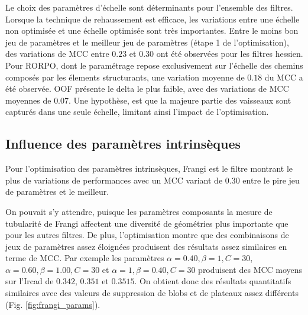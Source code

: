 Le choix des paramètres d'échelle sont déterminants pour l'ensemble des filtres. Lorsque la technique de rehaussement est efficace, les variations entre une échelle non optimisée et une échelle optimisée sont très importantes. Entre le moins bon jeu de paramètres et le meilleur jeu de paramètres (étape 1 de l'optimisation), des variations de MCC entre $0.23$ et $0.30$ ont été observées pour les filtres hessien. Pour RORPO, dont le paramétrage repose exclusivement sur l'échelle des chemins composés par les élements structurants, une variation moyenne de $0.18$ du MCC a été observée. OOF présente le delta le plus faible, avec des variations de MCC moyennes de $0.07$. Une hypothèse, est que la majeure partie des vaisseaux sont capturés dans une seule échelle, limitant ainsi l'impact de l'optimisation.

\subsection{Influence des paramètres intrinsèques}

Pour l'optimisation des paramètres intrinsèques, Frangi est le filtre montrant le plus de variations de performances avec un MCC variant de $0.30$ entre le pire jeu de paramètres et le meilleur. 

On pouvait s'y attendre, puisque les paramètres composants la mesure de tubularité de Frangi affectent une diversité de géométries plus importante  que pour les autres filtres. De plus, l'optimisation montre que des combinaisons de jeux de paramètres assez éloignées produisent des résultats assez similaires en terme de MCC. Par exemple les paramètres $\alpha=0.40,\beta=1,C=30$, $\alpha=0.60,\beta=1.00,C=30$ et $\alpha=1,\beta=0.40,C=30$ produisent des MCC moyens sur l'Ircad de $0.342$, $0.351$ et $0.3515$. On obtient donc des résultats quantitatifs similaires avec des valeurs de suppression de blobs et de plateaux assez différents (Fig. \ref{fig:frangi_params}).

